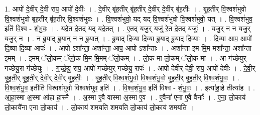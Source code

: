 \documentclass[17pt]{extarticle}
\begin{document}
1. आपो॑ दे॒वीर् दे॒वी राप॒ आपो॑ दे॒वीः । . दे॒वीर् बृ॑ह॒तीर् बृ॑ह॒तीर् दे॒वीर् दे॒वीर् बृ॑ह॒तीः । . बृ॒ह॒तीर् वि॒श्वशं॑भुवो वि॒श्वशं॑भुवो बृह॒तीर् बृ॑ह॒तीर् वि॒श्वशं॑भुवः । . वि॒श्वशं॑भुवो॒ यद् यद् वि॒श्वशं॑भुवो वि॒श्वशं॑भुवो॒ यत् । . वि॒श्वशं॑भुव॒ इति॑ वि॒श्व - शं॒भु॒वः॒ । . यदे॒त दे॒तद् यद् यदे॒तत् । . ए॒तद् यजु॒र् यजु॑ रे॒त दे॒तद् यजुः॑ । . यजु॒र् न न यजु॒र् यजु॒र् न । . न ब्रू॒याद् ब्रू॒यान् न न ब्रू॒यात् । . ब्रू॒याद् दि॒व्या दि॒व्या ब्रू॒याद् ब्रू॒याद् दि॒व्याः । . दि॒व्या आप॒ आपो॑ दि॒व्या दि॒व्या आपः॑ । . आपो ऽशा᳚न्ता॒ अशा᳚न्ता॒ आप॒ आपो ऽशा᳚न्ताः । . अशा᳚न्ता इ॒म मि॒म मशा᳚न्ता॒ अशा᳚न्ता इ॒मम् । . इ॒मम् ॅलो॒कम् ॅलो॒क मि॒म मि॒मम् ॅलो॒कम् । . लो॒क मा लो॒कम् ॅलो॒क मा । . आ ग॑च्छेयुर् गच्छेयु॒रा ग॑च्छेयुः । . ग॒च्छे॒यु॒ राप॒ आपो॑ गच्छेयुर् गच्छेयु॒ रापः॑ । . आपो॑ देवीर् देवी॒ राप॒ आपो॑ देवीः । . दे॒वी॒र् बृ॒ह॒ती॒र् बृ॒ह॒ती॒र् दे॒वी॒र् दे॒वी॒र् बृ॒ह॒तीः॒ । . बृ॒ह॒ती॒र् वि॒श्व॒शं॒भु॒वो॒ वि॒श्व॒शं॒भु॒वो॒ बृ॒ह॒ती॒र् बृ॒ह॒ती॒र् वि॒श्व॒शं॒भु॒वः॒ । . वि॒श्व॒शं॒भु॒व॒ इतीति॑ विश्वशंभुवो विश्वशंभुव॒ इति॑ । . वि॒श्व॒शं॒भु॒व॒ इति॑ विश्व - शं॒भु॒वः॒ । . इत्या॑हा॒हे तीत्या॑ह । . आ॒हा॒स्मा अ॒स्मा आ॑हा हा॒स्मै । . अ॒स्मा ए॒वै वास्मा अ॒स्मा ए॒व । . ए॒वैना॑ एना ए॒वै वैनाः᳚ । . ए॒ना॒ लो॒काय॑ लो॒कायै॑ना एना लो॒काय॑ । . लो॒काय॑ शमयति शमयति लो॒काय॑ लो॒काय॑ शमयति । \newline
\end{document}
